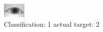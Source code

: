 \begin{figure}[h!]
\begin{center}
\includegraphics[width=0.60\columnwidth]{figures/ID984_class_1_target_2.png}
\end{center}
\caption{ Classification: 1 actual target: 2}
\label{fig:ID984_class_1_target_2}
\end{figure}
